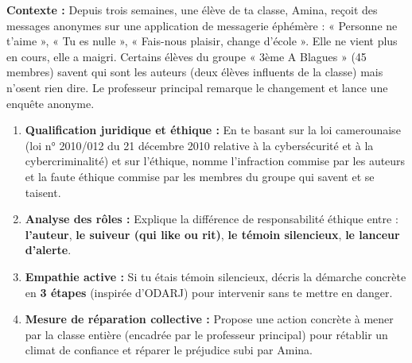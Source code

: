 \documentclass[11pt]{article}
\begin{document}
\begin{exercice}
\textbf{Contexte :} Depuis trois semaines, une élève de ta classe, Amina, reçoit des messages anonymes sur une application de messagerie éphémère : « Personne ne t'aime », « Tu es nulle », « Fais-nous plaisir, change d'école ». Elle ne vient plus en cours, elle a maigri. Certains élèves du groupe « 3ème A Blagues » (45 membres) savent qui sont les auteurs (deux élèves influents de la classe) mais n'osent rien dire. Le professeur principal remarque le changement et lance une enquête anonyme.

\begin{enumerate}
\item \textbf{Qualification juridique et éthique :} En te basant sur la loi camerounaise (loi n° 2010/012 du 21 décembre 2010 relative à la cybersécurité et à la cybercriminalité) et sur l'éthique, nomme l'infraction commise par les auteurs et la faute éthique commise par les membres du groupe qui savent et se taisent.
\item \textbf{Analyse des rôles :} Explique la différence de responsabilité éthique entre : \textbf{l'auteur}, \textbf{le suiveur (qui like ou rit)}, \textbf{le témoin silencieux}, \textbf{le lanceur d'alerte}.
\item \textbf{Empathie active :} Si tu étais témoin silencieux, décris la démarche concrète en \textbf{3 étapes} (inspirée d'ODARJ) pour intervenir sans te mettre en danger.
\item \textbf{Mesure de réparation collective :} Propose une action concrète à mener par la classe entière (encadrée par le professeur principal) pour rétablir un climat de confiance et réparer le préjudice subi par Amina.
\end{enumerate}
\end{exercice}
\end{document}

